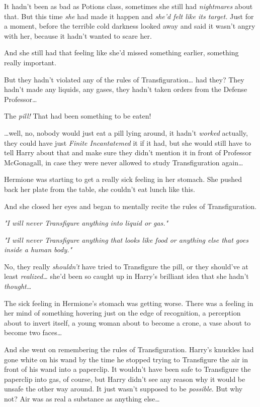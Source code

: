 It hadn't been as bad as Potions class, sometimes she still had 
\emph{nightmares} about that. But this time \emph{she} had made it happen and 
\emph{she'd felt like its target.} Just for a moment, before the terrible cold 
darkness looked away and said it wasn't angry with her, because it hadn't 
wanted to scare her.

And she still had that feeling like she'd missed something earlier, something 
really important.

But they hadn't violated any of the rules of Transfiguration{\ldots} had they? 
They hadn't made any liquids, any gases, they hadn't taken orders from the 
Defense Professor{\ldots}

The \emph{pill!} That had been something to be eaten!

{\ldots}well, no, nobody would just eat a pill lying around, it hadn't 
\emph{worked} actually, they could have just \emph{Finite Incantatemed} it if 
it had, but she would still have to tell Harry about that and make sure they 
didn't mention it in front of Professor McGonagall, in case they were never 
allowed to study Transfiguration again{\ldots}

Hermione was starting to get a really sick feeling in her stomach. She pushed 
back her plate from the table, she couldn't eat lunch like this.

And she closed her eyes and began to mentally recite the rules of 
Transfiguration.

\emph{"I will never Transfigure anything into liquid or gas."}

\emph{"I will never Transfigure anything that looks like food or anything else 
that goes inside a human body."}

No, they really \emph{shouldn't} have tried to Transfigure the pill, or they 
should've at least \emph{realized{\ldots}} she'd been so caught up in Harry's 
brilliant idea that she hadn't \emph{thought{\ldots}}

The sick feeling in Hermione's stomach was getting worse. There was a feeling 
in her mind of something hovering just on the edge of recognition, a perception 
about to invert itself, a young woman about to become a crone, a vase about to 
become two faces{\ldots}

And she went on remembering the rules of Transfiguration.
\sbreak
Harry's knuckles had gone white on his wand by the time he stopped trying to 
Transfigure the air in front of his wand into a paperclip. It wouldn't have 
been safe to Transfigure the paperclip into gas, of course, but Harry didn't 
see any reason why it would be unsafe the other way around. It just wasn't 
supposed to be \emph{possible}. But why not? Air was as real a substance as 
anything else{\ldots}

